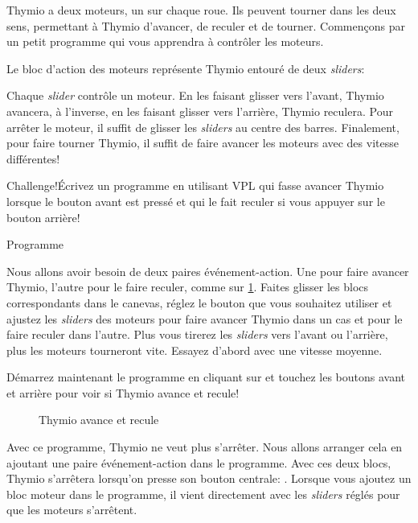 \label{Chap.Thymio.bouge}


Thymio a deux moteurs, un sur chaque roue. Ils peuvent tourner dans les deux sens, permettant à Thymio d'avancer, de reculer et de tourner. Commençons par un petit programme qui vous apprendra à contrôler les moteurs.

Le bloc d'action des moteurs représente Thymio entouré de deux \textit{sliders}:  

Chaque \textit{slider} contrôle un moteur. En les faisant glisser vers l'avant, Thymio avancera, à l'inverse, en les faisant glisser vers l'arrière, Thymio reculera. Pour arrêter le moteur, il suffit de glisser les \textit{sliders} au centre des barres. Finalement, pour faire tourner Thymio, il suffit de faire avancer les moteurs avec des vitesse différentes!

\begin{bclogo}[couleur = pink!30, arrondi = 0.1, logo = \bccrayon, ombre = true]{Challenge!}Écrivez un programme en utilisant VPL qui fasse avancer Thymio lorsque le bouton avant est pressé et qui le fait reculer si vous appuyer sur le bouton arrière!
\end{bclogo}

{\raggedleft \hfill Programme }

Nous allons avoir besoin de deux paires événement-action. Une pour faire avancer Thymio, l'autre pour le faire reculer, comme sur \cref{fig.nostop}. Faites glisser les blocs correspondants dans le canevas, réglez le bouton que vous souhaitez utiliser et ajustez les \textit{sliders} des moteurs pour faire avancer Thymio dans un cas et pour le faire reculer dans l'autre. Plus vous tirerez les \textit{sliders} vers l'avant ou l'arrière, plus les moteurs tourneront vite. Essayez d'abord avec une vitesse moyenne.

Démarrez maintenant le programme en cliquant sur  et touchez les boutons avant et arrière pour voir si Thymio avance et recule!

\begin{figure}
\begin{center}
\caption{Thymio avance et recule}\label{fig.nostop}
\end{center}
\end{figure}


Avec ce programme, Thymio ne veut plus s'arrêter. Nous allons arranger cela en ajoutant une paire événement-action dans le programme. Avec ces deux blocs, Thymio s'arrêtera lorsqu'on presse son bouton centrale: . Lorsque vous ajoutez un bloc moteur dans le programme, il vient directement avec les \textit{sliders} réglés pour que les moteurs s'arrêtent.

